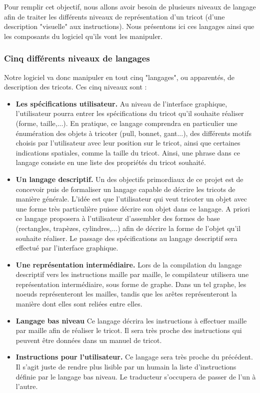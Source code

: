 \documentclass{article}
\begin{document}
Pour remplir cet objectif, nous allons avoir besoin de plusieurs niveaux de langage afin de traiter les différents niveaux de
représentation d'un tricot (d'une description "visuelle" aux instructions). Nous présentons ici ces langages ainsi que les composants du
logiciel qu'ils vont les manipuler.

\subsubsection{Cinq différents niveaux de langages}

Notre logiciel va donc manipuler en tout cinq "langages", ou apparentés, de description des tricots. Ces cinq niveaux sont :

\begin{itemize}
 \item \textbf{Les spécifications utilisateur.} Au niveau de l'interface graphique, l'utilisateur pourra entrer les spécifications du tricot qu'il souhaite réaliser (forme, taille,...). En pratique, ce langage comprendra en particulier une énumération des objets à tricoter (pull, bonnet, gant...), des différents motifs choisis par l'utilisateur avec leur position sur le tricot, ainsi que certaines indications spatiales, comme la taille du tricot. Ainsi, une phrase dans ce langage consiste en une liste des propriétés du tricot souhaité.
 \item \textbf{Un langage descriptif.} Un des objectifs primordiaux de ce projet est de concevoir puis de formaliser un langage capable de décrire les tricots de manière générale. L'idée est que l'utilisateur qui veut tricoter un objet avec une forme très particulière puisse décrire son objet dans ce langage. A priori ce langage proposera à l'utilisateur d'assembler des formes de base (rectangles, trapèzes, cylindres,...) afin de décrire la forme de l'objet qu'il souhaite réaliser. Le passage des spécifications au langage descriptif sera effectué par l'interface graphique.
 \item \textbf{Une représentation intermédiaire.} Lors de la compilation du langage descriptif vers les instructions maille par maille, le compilateur utilisera une représentation intermédiaire, sous forme de graphe. Dans un tel graphe, les noeuds représenteront les mailles, tandis que les arêtes représenteront la manière dont elles sont reliées entre elles.
 \item \textbf{Langage bas niveau} Ce langage décrira les instructions à effectuer maille par maille afin de réaliser le tricot. Il sera très proche des instructions qui peuvent être données dans un manuel de tricot.
 \item \textbf{Instructions pour l'utilisateur.} Ce langage sera très proche du précédent. Il s'agit juste de rendre plus lisible par un humain la liste d'instructions définie par le langage bas niveau. Le traducteur s'occupera de passer de l'un à l'autre.
\end{itemize}
\end{document}
